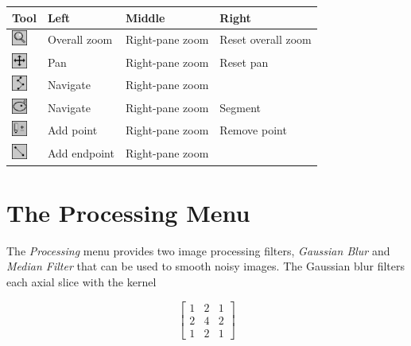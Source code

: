 \documentclass[12pt]{report}
\begin{document}
\begin{center}
\begin{tabular}{|l|l|l|l|}
\hline
Tool & Left & Middle & Right \\ %
\hline
\includegraphics[width=14pt]{zoom0.eps}   & Overall zoom & Right-pane zoom & Reset overall zoom  \\
\includegraphics[width=14pt]{pan0.eps}    & Pan          & Right-pane zoom & Reset pan \\
\includegraphics[width=14pt]{normal0.eps} & Navigate     & Right-pane zoom & \\
\includegraphics[width=14pt]{auto0.eps}   & Navigate     & Right-pane zoom & Segment \\
\includegraphics[width=14pt]{manual0.eps} & Add point    & Right-pane zoom & Remove point \\
\includegraphics[width=14pt]{dist0.eps}   & Add endpoint & Right-pane zoom &  \\
\hline
\end{tabular}
\end{center}



\section{The Processing Menu}

The \emph{Processing} menu provides two image processing filters,
\emph{Gaussian Blur} and \emph{Median Filter} that can be used to smooth
noisy images. The Gaussian blur filters each axial slice with the kernel

\[
\left[
\begin{array}{ccc}
1 & 2 & 1 \\
2 & 4 & 2 \\
1 & 2 & 1
\end{array}
\right]
\]
\end{document}
